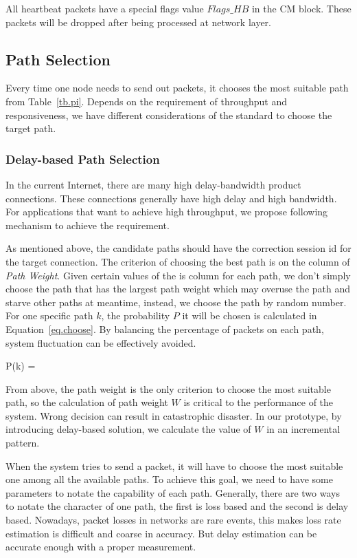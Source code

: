 All heartbeat packets have a special flags value $Flags\_HB$ in the CM block. These packets will be dropped after being processed at network layer.


\subsection{Path Selection}
\label{sec:selection}

Every time one node needs to send out packets, it chooses the most suitable path from Table~\ref{tb.pi}. Depends on the requirement of throughput and responsiveness, we have different considerations of the standard to choose the target path.

\subsubsection{Delay-based Path Selection}
\label{sec:delay}
In the current Internet, there are many high delay-bandwidth product connections. These connections generally have high delay and high bandwidth. For applications that want to achieve high throughput, we propose following mechanism to achieve the requirement.


As mentioned above, the candidate paths should have the correction session id for the target connection. The criterion of choosing the best path is on the column of \emph{Path Weight}. Given certain values of the is column for each path, we don't simply choose the path that has the largest path weight which may overuse the path and starve other paths at meantime, instead, we choose the path by random number. For one specific path $k$, the probability $P$ it will be chosen is calculated in Equation~\ref{eq.choose}. By balancing the percentage of packets on each path, system fluctuation can be effectively avoided.

\be
\label{eq.choose}
P(k) = 
\ee

From above, the path weight is the only criterion to choose the most suitable path, so the calculation of path weight $W$ is critical to the performance of the system. Wrong decision can result in catastrophic disaster. In our prototype, by introducing 
delay-based solution, we calculate the value of $W$ in an incremental pattern.

When the system tries to send a packet, it will have to choose the most suitable one among all the available paths. To achieve this goal, we need to have some parameters to notate the capability of each path. Generally, there are two ways to notate the character of one path, the first is loss based and the second is delay based. Nowadays, packet losses in networks are rare events, this makes loss rate estimation is difficult and coarse in accuracy. But delay estimation can be accurate enough with a proper measurement.


